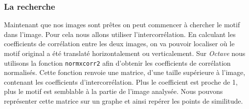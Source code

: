 \documentclass[a4paper,12pt,titlepage]{report}
\newcommand{\octave}{\textit{Octave }}
\begin{document}
		\subsubsection{La recherche}
		Maintenant que nos images sont prêtes on peut commencer à chercher le motif dans l'image. Pour cela nous allons utiliser l'intercorrélation. En calculant les coefficients de corrélation entre les deux images, on va pouvoir localiser où le motif original a été translaté horizontalement ou verticalement.
		Sur \octave nous utilisons la fonction \texttt{normxcorr2} afin d'obtenir les coefficients de corrélation normalisés. Cette fonction renvoie une matrice, d'une taille supérieure à l'image, contenant les coefficients d'intercorrélation. Plus le coefficient est proche de 1, plus le motif est semblable à la partie de l'image analysée.
		Nous pouvons représenter cette matrice sur un graphe et ainsi repérer les points de similitude.
		
\end{document}
